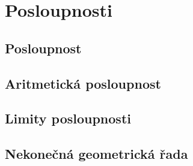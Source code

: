 
\newpage
    \section{Posloupnosti}
        \subsection{Posloupnost}
        \subsection{Aritmetická posloupnost}
        \subsection{Limity posloupnosti}
        \subsection{Nekonečná geometrická řada}